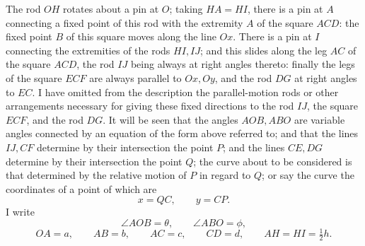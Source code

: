 \documentclass[11pt,a4paper]{article}
\begin{document}
\begin{center}
\end{center}

The rod \(OH\) rotates about a pin at \(O\); taking \(HA=HI\), there is a pin at
\(A\) connecting a fixed point of this rod with the extremity \(A\) of the square
\(ACD\): the fixed point \(B\) of this square moves along the line \(Ox\). There is
a pin at \(I\) connecting the extremities of the rods \(HI,IJ\); and this slides along
the leg \(AC\) of the square \(ACD\), the rod \(IJ\) being always at right angles
thereto: finally the legs of the square \(ECF\) are always parallel to \(Ox,Oy\), and
the rod \(DG\) at right angles to \(EC\). I have omitted from the description the
parallel-motion rods or other arrangements necessary for giving these fixed directions
to the rod \(IJ\), the square \(ECF\), and the rod \(DG\). It will be seen that the
angles \(AOB,ABO\) are variable angles connected by an equation of the form above
referred to; and that the lines \(IJ,CF\) determine by their intersection the point
\(P\); and the lines \(CE,DG\) determine by their intersection the point \(Q\); the
curve about to be considered is that determined by the relative motion of \(P\) in
regard to \(Q\); or say the curve the coordinates of a point of which are
\[
x=QC,\qquad y=CP.
\]
I write
\[
\angle AOB=\theta,\qquad \angle ABO=\phi,
\]
\[
OA=a,\qquad AB=b,\qquad AC=c,\qquad CD=d,\qquad AH=HI=\tfrac12h.
\]
\end{document}
